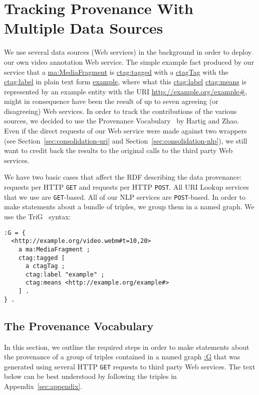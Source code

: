 \documentclass{acm_proc_article-sp}
\begin{document}

\section{Tracking Provenance With Multiple Data Sources}                    \label{sec:tracking}
We use several data sources (Web services) in the background in order to deploy our own video annotation Web service.
The simple example fact produced by our service that a \url{ma:MediaFragment} is \url{ctag:tagged} with a \url{ctagTag}
with the \url{ctag:label} in plain text form \url{example}, where what this \url{ctag:label} \url{ctag:means} is
represented by an example entity with the URI \url{http://example.org/example#}, might in consequence have been the
result of up to seven agreeing (or disagreeing) Web services. In order to track the contributions of the various
sources, we decided to use the Provenance Vocabulary~\cite{Hartig:Provenance} by Hartig and Zhao. Even if the direct
requests of our Web service were made against two wrappers (see Section~\ref{sec:consolidation-uri} and
Section~\ref{sec:consolidation-nlp}), we still want to credit back the results to the original calls to the third party
Web services.

We have two basic cases that affect the RDF describing the data provenance: requests per HTTP \texttt{GET} and requests
per HTTP \texttt{POST}. All URI Lookup services that we use are \texttt{GET}-based. All of our NLP services are
\texttt{POST}-based. In order to make statements about a bundle of triples, we group them in a named graph. We use the
TriG~\cite{Bizer:TriG} syntax:
\begin{lstlisting}
:G = {
  <http://example.org/video.webm#t=10,20>
    a ma:MediaFragment ;
    ctag:tagged [
      a ctagTag ;
      ctag:label "example" ;
      ctag:means <http://example.org/example#>
    ] .
} .
\end{lstlisting}

\subsection{The Provenance Vocabulary}                                      \label{sec:provenance}
In this section, we outline the required steps in order to make statements about the provenance of a group of triples
contained in a named graph \url{:G} that was generated using several HTTP \texttt{GET} requests to third party Web
services. The text below can be best understood by following the triples in Appendix~\ref{sec:appendix}.
\end{document}
